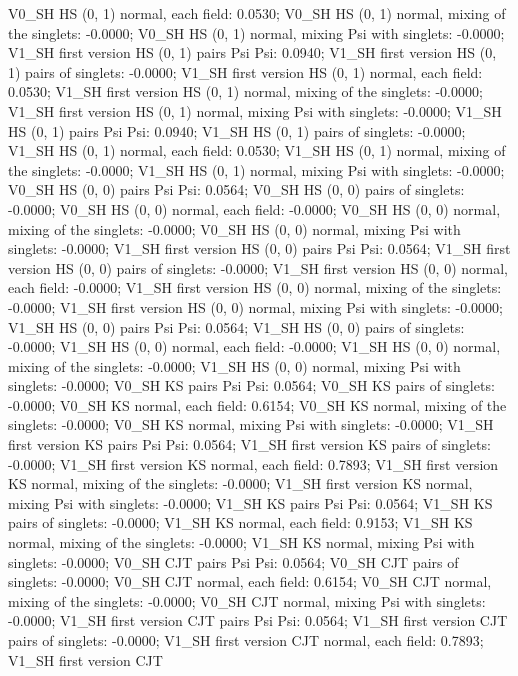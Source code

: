 \documentclass[
  10pt,
]{article}
\begin{document}
\begin{longtable}[]
V0\_SH HS (0, 1) normal, each field: 0.0530; V0\_SH HS (0, 1) normal,
mixing of the singlets: -0.0000; V0\_SH HS (0, 1) normal, mixing Psi
with singlets: -0.0000; V1\_SH first version HS (0, 1) pairs Psi Psi:
0.0940; V1\_SH first version HS (0, 1) pairs of singlets: -0.0000;
V1\_SH first version HS (0, 1) normal, each field: 0.0530; V1\_SH first
version HS (0, 1) normal, mixing of the singlets: -0.0000; V1\_SH first
version HS (0, 1) normal, mixing Psi with singlets: -0.0000; V1\_SH HS
(0, 1) pairs Psi Psi: 0.0940; V1\_SH HS (0, 1) pairs of singlets:
-0.0000; V1\_SH HS (0, 1) normal, each field: 0.0530; V1\_SH HS (0, 1)
normal, mixing of the singlets: -0.0000; V1\_SH HS (0, 1) normal, mixing
Psi with singlets: -0.0000; V0\_SH HS (0, 0) pairs Psi Psi: 0.0564;
V0\_SH HS (0, 0) pairs of singlets: -0.0000; V0\_SH HS (0, 0) normal,
each field: -0.0000; V0\_SH HS (0, 0) normal, mixing of the singlets:
-0.0000; V0\_SH HS (0, 0) normal, mixing Psi with singlets: -0.0000;
V1\_SH first version HS (0, 0) pairs Psi Psi: 0.0564; V1\_SH first
version HS (0, 0) pairs of singlets: -0.0000; V1\_SH first version HS
(0, 0) normal, each field: -0.0000; V1\_SH first version HS (0, 0)
normal, mixing of the singlets: -0.0000; V1\_SH first version HS (0, 0)
normal, mixing Psi with singlets: -0.0000; V1\_SH HS (0, 0) pairs Psi
Psi: 0.0564; V1\_SH HS (0, 0) pairs of singlets: -0.0000; V1\_SH HS (0,
0) normal, each field: -0.0000; V1\_SH HS (0, 0) normal, mixing of the
singlets: -0.0000; V1\_SH HS (0, 0) normal, mixing Psi with singlets:
-0.0000; V0\_SH KS pairs Psi Psi: 0.0564; V0\_SH KS pairs of singlets:
-0.0000; V0\_SH KS normal, each field: 0.6154; V0\_SH KS normal, mixing
of the singlets: -0.0000; V0\_SH KS normal, mixing Psi with singlets:
-0.0000; V1\_SH first version KS pairs Psi Psi: 0.0564; V1\_SH first
version KS pairs of singlets: -0.0000; V1\_SH first version KS normal,
each field: 0.7893; V1\_SH first version KS normal, mixing of the
singlets: -0.0000; V1\_SH first version KS normal, mixing Psi with
singlets: -0.0000; V1\_SH KS pairs Psi Psi: 0.0564; V1\_SH KS pairs of
singlets: -0.0000; V1\_SH KS normal, each field: 0.9153; V1\_SH KS
normal, mixing of the singlets: -0.0000; V1\_SH KS normal, mixing Psi
with singlets: -0.0000; V0\_SH CJT pairs Psi Psi: 0.0564; V0\_SH CJT
pairs of singlets: -0.0000; V0\_SH CJT normal, each field: 0.6154;
V0\_SH CJT normal, mixing of the singlets: -0.0000; V0\_SH CJT normal,
mixing Psi with singlets: -0.0000; V1\_SH first version CJT pairs Psi
Psi: 0.0564; V1\_SH first version CJT pairs of singlets: -0.0000; V1\_SH
first version CJT normal, each field: 0.7893; V1\_SH first version CJT

\end{longtable}
\end{document}

